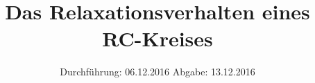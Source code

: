 

\subject{V. 353}
\title{Das Relaxationsverhalten eines RC-Kreises}
\date{
\centering
  Durchführung: 06.12.2016
  \hspace{3em}
  Abgabe: 13.12.2016
}



\maketitle
\thispagestyle{empty}
\tableofcontents
\newpage








\printbibliography


